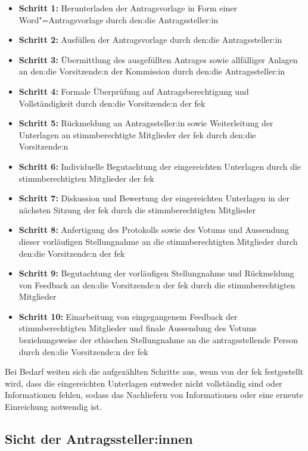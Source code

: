 \documentclass[a4paper,12pt,twoside]{scrreprt}
\begin{document}
\begin{itemize}
    \item \textbf{Schritt 1:} Herunterladen der Antragsvorlage in Form einer Word"=Antragsvorlage durch den:die Antragssteller:in
    \item \textbf{Schritt 2:} Ausfüllen der Antragsvorlage durch den:die Antragssteller:in
    \item \textbf{Schritt 3:} Übermittlung des ausgefüllten Antrages sowie allfälliger Anlagen an den:die Vorsitzende:n der Kommission durch den:die Antragssteller:in
    \item \textbf{Schritt 4:} Formale Überprüfung auf Antragsberechtigung und Vollständigkeit durch den:die Vorsitzende:n der \ac{fek}
    \item \textbf{Schritt 5:} Rückmeldung an Antragssteller:in sowie Weiterleitung der Unterlagen an stimmberechtigte Mitglieder der \ac{fek} durch den:die Vorsitzende:n
    \item \textbf{Schritt 6:} Individuelle Begutachtung der eingereichten Unterlagen durch die stimmberechtigten Mitglieder der \ac{fek}
    \item \textbf{Schritt 7:} Diskussion und Bewertung der eingereichten Unterlagen in der nächsten Sitzung der \ac{fek} durch die stimmberechtigten Mitglieder
    \item \textbf{Schritt 8:} Anfertigung des Protokolls sowie des Votums und Aussendung dieser vorläufigen Stellungnahme an die stimmberechtigten Mitglieder durch den:die Vorsitzende:n der \ac{fek}
    \item \textbf{Schritt 9:} Begutachtung der vorläufigen Stellungnahme und Rückmeldung von Feedback an den:die Vorsitzende:n der \ac{fek} durch die stimmberechtigten Mitglieder
    \item \textbf{Schritt 10:} Einarbeitung von eingegangenem Feedback der stimmberechtigten Mitglieder und finale Aussendung des Votums beziehungsweise der ethischen Stellungnahme an die antragsstellende Person durch den:die Vorsitzende:n der \ac{fek}
\end{itemize}

Bei Bedarf weiten sich die aufgezählten Schritte aus, wenn von der \ac{fek} festgestellt wird, dass die eingereichten Unterlagen entweder nicht vollständig sind oder Informationen fehlen, sodass das Nachliefern von Informationen oder eine erneute Einreichung notwendig ist.

\subsection{Sicht der Antragssteller:innen}
\label{sub-sec:sicht-antragssteller}
\end{document}
